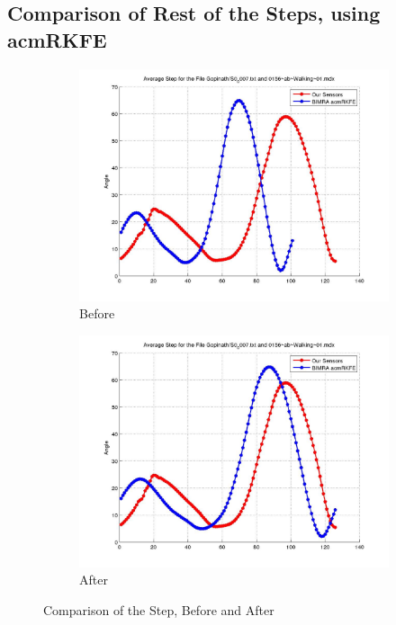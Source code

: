 \documentclass[12pt]{article}
\begin{document}
\FloatBarrier

\subsection*{Comparison of Rest of the Steps, using acmRKFE}
\begin{figure}[h]%

\begin{subfigure}[!htb]{2cm}
\hspace*{-2cm} \includegraphics[scale=.22]{S0_0007_before_acmrkfe.jpg}
\caption{Before}
\end{subfigure}
\hfill\hfill
\begin{subfigure}[h]{0.4\textwidth}
\hspace*{-2cm} \includegraphics[scale=.22]{S0_0007_after_acmrkfe.jpg}
\caption{After}
\end{subfigure}%

\caption[Hello]{Comparison of the Step, Before and After}
\end{figure}
\end{document}
